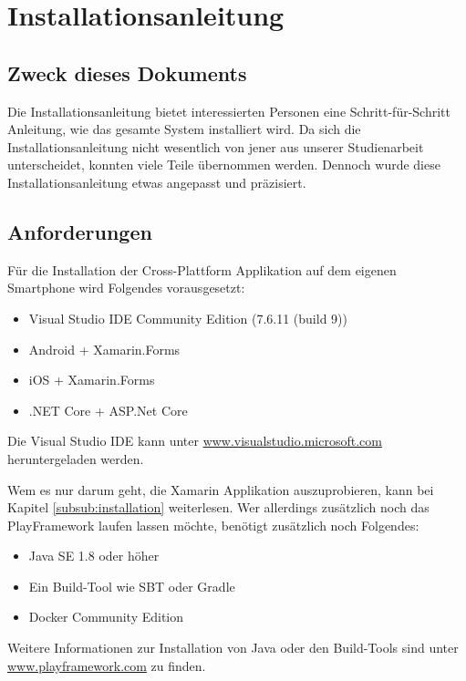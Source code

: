 \section{Installationsanleitung}

\subsection{Zweck dieses Dokuments}
Die Installationsanleitung bietet interessierten Personen eine Schritt-für-Schritt Anleitung, wie das gesamte System installiert wird. Da sich die Installationsanleitung nicht wesentlich von jener aus unserer Studienarbeit \cite{methode635-sa} unterscheidet, konnten viele Teile übernommen werden. Dennoch wurde diese Installationsanleitung etwas angepasst und präzisiert. 
 
\subsection{Anforderungen}
Für die Installation der Cross-Plattform Applikation auf dem eigenen Smartphone wird Folgendes vorausgesetzt:

\begin{itemize}
  \item Visual Studio IDE Community Edition (7.6.11 (build 9))
  \item Android + Xamarin.Forms
  \item iOS + Xamarin.Forms
  \item .NET Core + ASP.Net Core
\end{itemize}
Die Visual Studio IDE kann unter \href{https://visualstudio.microsoft.com/de/vs/}{www.visualstudio.microsoft.com} heruntergeladen werden. 

Wem es nur darum geht, die Xamarin Applikation auszuprobieren, kann bei Kapitel \ref{subsub:installation} weiterlesen. Wer allerdings zusätzlich noch das PlayFramework laufen lassen möchte, benötigt zusätzlich noch Folgendes:

\begin{itemize}
  \item Java SE 1.8 oder höher
  \item Ein Build-Tool wie SBT oder Gradle
  \item Docker Community Edition
\end{itemize}
Weitere Informationen zur Installation von Java oder den Build-Tools sind unter \href{https://www.playframework.com/documentation/2.6.x/Requirements}{www.play\-frame\-work.com} zu finden.


